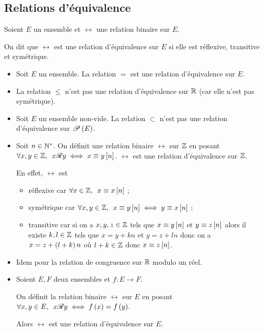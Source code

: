 \subsection{Relations d'équivalence}

\begin{defi}
Soient \(E\) un ensemble et \(\rel\) une relation binaire sur \(E\).

On dit que \(\rel\) est une relation d'équivalence sur \(E\) si elle est réflexive, transitive et symétrique.
\end{defi}

\begin{ex}
\begin{itemize}
\item Soit \(E\) un ensemble. La relation \(=\) est une relation d'équivalence sur \(E\).

\item La relation \(\leq\) n'est pas une relation d'équivalence sur \(\R\) (car elle n'est pas symétrique).

\item Soit \(E\) un ensemble non-vide. La relation \(\subset\) n'est pas une relation d'équivalence sur \(\P{E}\).

\item Soit \(n\in\Ns\). On définit une relation binaire \(\rel\) sur \(\Z\) en posant \(\quantifs{\forall x,y\in\Z}x\rel y\iff x\equiv y\croch{n}\). \(\rel\) est une relation d'équivalence sur \(\Z\).

En effet, \(\rel\) est \begin{itemize}
\item réflexive car \(\quantifs{\forall x\in\Z}x\equiv x\croch{n}\) ;

\item symétrique car \(\quantifs{\forall x,y\in\Z}x\equiv y\croch{n}\iff y\equiv x\croch{n}\) ;

\item transitive car si on a \(x,y,z\in\Z\) tels que \(x\equiv y\croch{n}\) et \(y\equiv z\croch{n}\) alors il existe \(k,l\in\Z\) tels que \(x=y+kn\) et \(y=z+ln\) donc on a \(x=z+\paren{l+k}n\) où \(l+k\in\Z\) donc \(x\equiv z\croch{n}\).
\end{itemize}

\item Idem pour la relation de congruence sur \(\R\) modulo un réel.

\item Soient \(E,F\) deux ensembles et \(f:E\to F\).

On définit la relation binaire \(\rel\) sur \(E\) en posant \(\quantifs{\forall x,y\in E}x\rel y\iff f\paren{x}=f\paren{y}\).

Alors \(\rel\) est une relation d'équivalence sur \(E\).
\end{itemize}
\end{ex}

